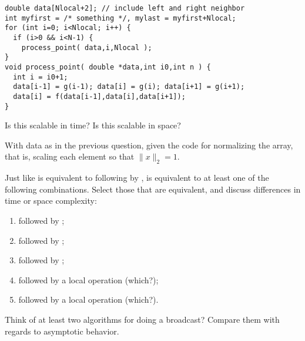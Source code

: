 \begin{review}
\begin{lstlisting}
double data[Nlocal+2]; // include left and right neighbor
int myfirst = /* something */, mylast = myfirst+Nlocal;
for (int i=0; i<Nlocal; i++) {
  if (i>0 && i<N-1) {
    process_point( data,i,Nlocal );
}
void process_point( double *data,int i0,int n ) {
  int i = i0+1;    
  data[i-1] = g(i-1); data[i] = g(i); data[i+1] = g(i+1);
  data[i] = f(data[i-1],data[i],data[i+1]); 
}
\end{lstlisting}
Is this scalable in time? Is this scalable in space?
\end{review}

\begin{review}
  With data as in the previous question, given the code for
  normalizing the array, that is, scaling each element so that $\|x\|_2=1$.
\end{review}

\begin{review}
  Just like  is equivalent to
   following by ,
   is equivalent to at least
  one of the following combinations. Select those that are equivalent,
  and discuss differences in time or space complexity:
  \begin{enumerate}
  \item {} followed by ;
  \item {} followed by ;
  \item {} followed by ;
  \item {} followed by a local operation (which?);
  \item {} followed by a local operation (which?).
  \end{enumerate}
\end{review}

\begin{review}
  Think of at least two algorithms for doing a broadcast?
  Compare them with regards to asymptotic behavior.
\end{review}
